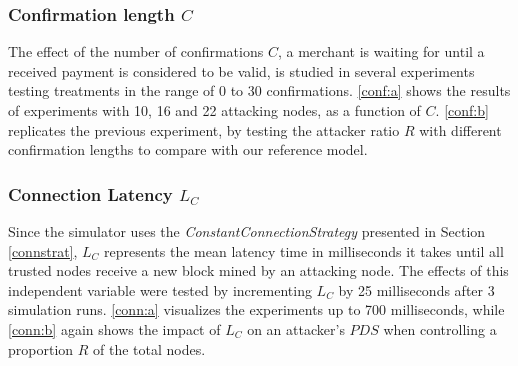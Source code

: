 \documentclass[a4paper,12pt,twoside]{report}
\begin{document}
\subsubsection{Confirmation length $C$} \label{consres}
The effect of the number of confirmations $C$, a merchant is waiting for until a received payment is considered to be valid, is studied in several experiments testing treatments in the range of 0 to 30 confirmations. \autoref{conf:a} shows the results of experiments with 10, 16 and 22 attacking nodes, as a function of $C$. \autoref{conf:b} replicates the previous experiment, by testing the attacker ratio $R$ with different confirmation lengths to compare with our reference model.

\subsubsection{Connection Latency $L_C$}
Since the simulator uses the \textit{ConstantConnectionStrategy} presented in Section \ref{connstrat}, $L_C$ represents the mean latency time in milliseconds it takes until all trusted nodes receive a new block mined by an attacking node. The effects of this independent variable were tested by incrementing $L_C$ by 25 milliseconds after 3 simulation runs. \autoref{conn:a} visualizes the experiments up to 700 milliseconds, while \autoref{conn:b} again shows the impact of $L_C$ on an attacker's $PDS$ when controlling a proportion $R$ of the total nodes.
\end{document}
